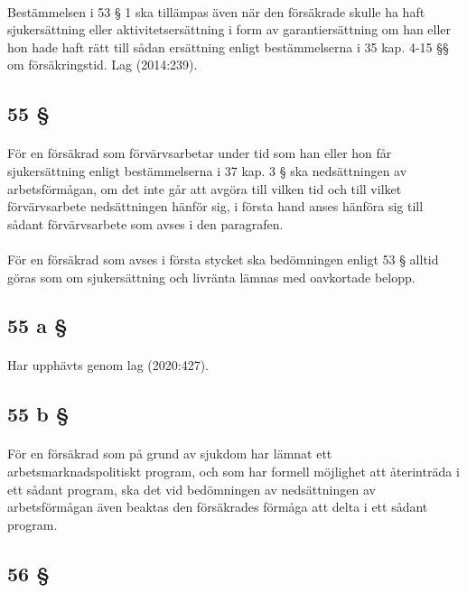 \documentclass[a4paper,notitlepage,openany,10pt]{book}
\begin{document}
\paragraph*{}
Bestämmelsen i 53 § 1 ska tillämpas även när den försäkrade skulle ha haft sjukersättning eller aktivitetsersättning i form av garantiersättning om han eller hon hade haft rätt till sådan ersättning enligt bestämmelserna i 35 kap. 4-15 §§ om försäkringstid.
Lag (2014:239).
\subsection*{55 §}
\paragraph*{}
För en försäkrad som förvärvsarbetar under tid som han eller hon får sjukersättning enligt bestämmelserna i 37 kap. 3 § ska nedsättningen av arbetsförmågan, om det inte går att avgöra till vilken tid och till vilket förvärvsarbete nedsättningen hänför sig, i första hand anses hänföra sig till sådant förvärvsarbete som avses i den paragrafen.
\paragraph*{}
För en försäkrad som avses i första stycket ska bedömningen enligt 53 § alltid göras som om sjukersättning och livränta lämnas med oavkortade belopp.
\subsection*{55 a §}
\paragraph*{}
Har upphävts genom
lag (2020:427).
\subsection*{55 b §}
\paragraph*{}
För en försäkrad som på grund av sjukdom har lämnat ett arbetsmarknadspolitiskt program, och som har formell möjlighet att återinträda i ett sådant program, ska det vid bedömningen av nedsättningen av arbetsförmågan även beaktas den försäkrades förmåga att delta i ett sådant program.
\subsection*{56 §}
\end{document}
